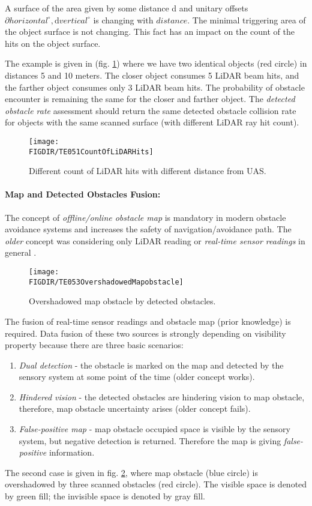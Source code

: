 A surface of the area given by some distance d and unitary offsets$\partial horizontal^\circ, \text{d} vertical^\circ$  is changing with $distance$. The minimal triggering area of the object surface is not changing. This fact has an impact on the count of the hits on the object surface. 

The example is given in (fig. \ref{fig:P01CountOfLiDARHits}) where we have two identical objects (red circle) in distances 5 and 10 meters. The closer object consumes 5 LiDAR beam hits, and the farther object consumes only 3 LiDAR beam hits. The probability of obstacle encounter is remaining the same for the closer and farther object. The \emph{detected obstacle rate} assessment should return the same  detected obstacle collision rate for objects with the same scanned surface (with different LiDAR ray hit count).

\begin{figure}[H]
    \centering
    \texttt{[image: \\FIGDIR/TE051CountOfLiDARHits]}
    \caption{Different count of LiDAR hits with different distance from UAS.}
    \label{fig:P01CountOfLiDARHits}
\end{figure}


\paragraph{Map and Detected Obstacles Fusion:} The concept of \emph{offline/online obstacle map} is mandatory in modern obstacle avoidance systems and increases the safety of navigation/avoidance path. The \emph{older} concept was considering only LiDAR reading or \emph{real-time sensor readings} in general \cite{gomola2017probabilistic}. 

\begin{figure}[htbp]
    \centering
    \texttt{[image: \\FIGDIR/TE053OvershadowedMapobstacle]}
    \caption{Overshadowed map obstacle by detected obstacles.}
    \label{fig:P02OvershadowedMapobstacle}
\end{figure}

\newpage\noindent The fusion of real-time sensor readings and obstacle map (prior knowledge) is required. Data fusion of these two sources is strongly depending on visibility property because there are three basic scenarios:

\begin{enumerate}
    \item \emph{Dual detection} - the obstacle is marked on the map and detected by the sensory system at some point of the time (older concept works).
    
    \item \emph{Hindered vision} - the detected obstacles are hindering vision to map obstacle, therefore, map obstacle uncertainty arises (older concept fails). 
    
    \item \emph{False-positive map} - map obstacle occupied space is visible by the sensory system, but negative detection is returned. Therefore the map is giving \emph{false-positive} information.
\end{enumerate}

\noindent The second case is given in fig. \ref{fig:P02OvershadowedMapobstacle}, where map obstacle (blue circle) is overshadowed by three scanned obstacles (red circle). The visible space is denoted by green fill; the invisible space is denoted by gray fill. 